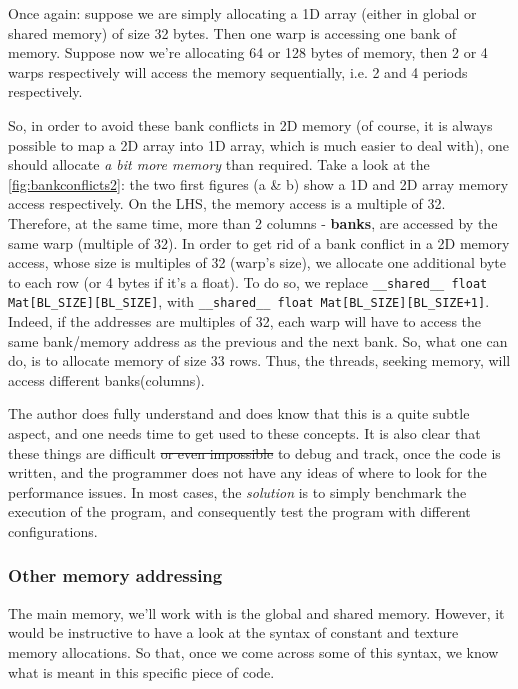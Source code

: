 Once again: suppose we are simply allocating a 1D array (either in global or shared memory) of size 32 bytes. Then one warp is accessing one bank of memory. 
Suppose now we're allocating 64 or 128 bytes of memory, then 2 or 4 warps respectively will access the memory sequentially, i.e. 2 and 4 periods respectively.

So, in order to avoid these bank conflicts in 2D memory (of course, it is always possible to map a 2D array into 1D array, which is much easier to deal with), one should allocate 
\textit{a bit more memory} than required. Take a look at the \autoref{fig:bankconflicts2}: the two first figures (a \& b) show a 1D and 2D array memory access respectively. 
On the LHS, the memory access is a multiple of 32. Therefore, at the same time, more than 2 columns - \textbf{banks}, are accessed by the same warp (multiple of 32). 
In order to get rid of a bank conflict in a 2D memory access, whose size is multiples of 32 (warp's size), we allocate one additional byte to each row (or 4 bytes if it's a float).
To do so, we replace \verb|__shared__ float Mat[BL_SIZE][BL_SIZE]|, with \verb|__shared__ float Mat[BL_SIZE][BL_SIZE+1]|. Indeed, if the addresses are multiples of 32, each warp will 
have to access the same bank/memory address as the previous and the next bank. So, what one can do, is to allocate memory of size 33 rows. Thus, the threads, seeking memory, will 
access different banks(columns).

The author does fully understand and does know that this is a quite subtle aspect, and one needs time to get used 
to these concepts. It is also clear that these things are difficult \sout{or even impossible} to debug and track, once the code is written, and the programmer 
does not have any ideas of where to look for the performance issues. In most cases, 
the \textit{solution} is to simply benchmark the execution of the program, and consequently test the program with different configurations. 

\subsubsection{Other memory addressing}
The main memory, we'll work with is the global and shared memory. However, it would be instructive to have a look at the 
syntax of constant and texture memory allocations. So that, once we come across some of this syntax, we know what is meant 
in this specific piece of code. 

\vspace{-15pt}
